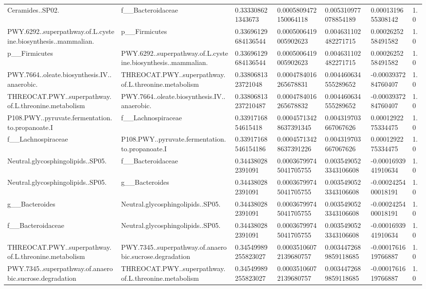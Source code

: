 \begin{longtable}{lllllll}
Ceramides..SP02. & f\_\_Bacteroidaceae & 0.333308621343673 & 0.0005809472150064118 & 0.005310977078854189 & 0.0001319655308142 & 1.0 \\
PWY.6292..superpathway.of.L.cysteine.biosynthesis..mammalian. & p\_\_Firmicutes & 0.33696129684136544 & 0.0005006419005902623 & 0.004631102482271715 & 0.0002625258491582 & 1.0 \\
p\_\_Firmicutes & PWY.6292..superpathway.of.L.cysteine.biosynthesis..mammalian. & 0.33696129684136544 & 0.0005006419005902623 & 0.004631102482271715 & 0.0002625258491582 & 1.0 \\
PWY.7664..oleate.biosynthesis.IV..anaerobic. & THREOCAT.PWY..superpathway.of.L.threonine.metabolism & 0.3380681323721048 & 0.0004784016265678831 & 0.004460634555289652 & -0.0003937284760407 & 1.0 \\
THREOCAT.PWY..superpathway.of.L.threonine.metabolism & PWY.7664..oleate.biosynthesis.IV..anaerobic. & 0.33806813237210487 & 0.0004784016265678832 & 0.004460634555289652 & -0.0003937284760407 & 1.0 \\
P108.PWY..pyruvate.fermentation.to.propanoate.I & f\_\_Lachnospiraceae & 0.3391716854615418 & 0.00045713428637391345 & 0.004319703667067626 & 0.0001292275334475 & 1.0 \\
f\_\_Lachnospiraceae & P108.PWY..pyruvate.fermentation.to.propanoate.I & 0.33917168546154186 & 0.00045713428637391226 & 0.004319703667067626 & 0.0001292275334475 & 1.0 \\
Neutral.glycosphingolipids..SP05. & f\_\_Bacteroidaceae & 0.344380282391091 & 0.00036799745041705755 & 0.0035490523343106608 & -0.0001693941910634 & 1.0 \\
Neutral.glycosphingolipids..SP05. & g\_\_Bacteroides & 0.344380282391091 & 0.00036799745041705755 & 0.0035490523343106608 & -0.0002425400018191 & 1.0 \\
g\_\_Bacteroides & Neutral.glycosphingolipids..SP05. & 0.344380282391091 & 0.00036799745041705755 & 0.0035490523343106608 & -0.0002425400018191 & 1.0 \\
f\_\_Bacteroidaceae & Neutral.glycosphingolipids..SP05. & 0.344380282391091 & 0.00036799745041705755 & 0.0035490523343106608 & -0.0001693941910634 & 1.0 \\
THREOCAT.PWY..superpathway.of.L.threonine.metabolism & PWY.7345..superpathway.of.anaerobic.sucrose.degradation & 0.34549989255823027 & 0.00035106072139680757 & 0.0034472689859118685 & -0.0001761619766887 & 1.0 \\
PWY.7345..superpathway.of.anaerobic.sucrose.degradation & THREOCAT.PWY..superpathway.of.L.threonine.metabolism & 0.34549989255823027 & 0.00035106072139680757 & 0.0034472689859118685 & -0.0001761619766887 & 1.0 \\

\end{longtable}
